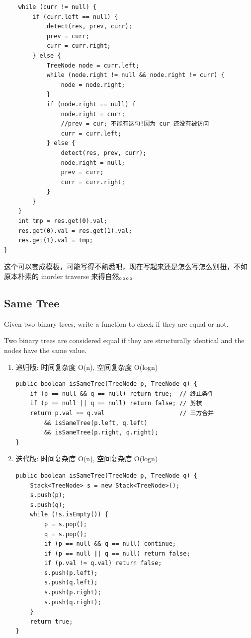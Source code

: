 \documentclass[12pt]{book}
\begin{document}
\begin{enumerate}
\begin{lstlisting}
    while (curr != null) {
        if (curr.left == null) {
            detect(res, prev, curr);
            prev = curr;
            curr = curr.right;
        } else {
            TreeNode node = curr.left;
            while (node.right != null && node.right != curr) {
                node = node.right;
            }
            if (node.right == null) {
                node.right = curr;
                //prev = cur; 不能有这句!因为 cur 还没有被访问
                curr = curr.left;
            } else {
                detect(res, prev, curr);
                node.right = null;
                prev = curr;
                curr = curr.right;
            }
        }
    }
    int tmp = res.get(0).val;
    res.get(0).val = res.get(1).val;
    res.get(1).val = tmp;
}
\end{lstlisting}

这个可以套成模板，可能写得不熟悉吧，现在写起来还是怎么写怎么别扭，不如
原本朴素的 inorder traverse 来得自然。。。。
\end{enumerate}

\subsection{Same Tree}
\label{sec-4-2-8}
Given two binary trees, write a function to check if they are equal or not.

Two binary trees are considered equal if they are structurally identical and the nodes have the same value.
\begin{enumerate}
\item 递归版: 时间复杂度 O(n), 空间复杂度 O(logn)
\label{sec-4-2-8-1}

\lstset{language=java,label= ,caption= ,numbers=none}
\begin{lstlisting}
public boolean isSameTree(TreeNode p, TreeNode q) {
    if (p == null && q == null) return true;  // 终止条件
    if (p == null || q == null) return false; // 剪枝
    return p.val == q.val                     // 三方合并
        && isSameTree(p.left, q.left)                
        && isSameTree(p.right, q.right);
}
\end{lstlisting}

\item 迭代版: 时间复杂度 O(n), 空间复杂度 O(logn)
\label{sec-4-2-8-2}

\lstset{language=java,label= ,caption= ,numbers=none}
\begin{lstlisting}
public boolean isSameTree(TreeNode p, TreeNode q) {
    Stack<TreeNode> s = new Stack<TreeNode>();
    s.push(p);
    s.push(q);
    while (!s.isEmpty()) {
        p = s.pop();
        q = s.pop();
        if (p == null && q == null) continue;
        if (p == null || q == null) return false;
        if (p.val != q.val) return false;
        s.push(p.left);
        s.push(q.left);
        s.push(p.right);
        s.push(q.right);
    }
    return true;
}
\end{lstlisting}
\end{enumerate}
\end{document}
